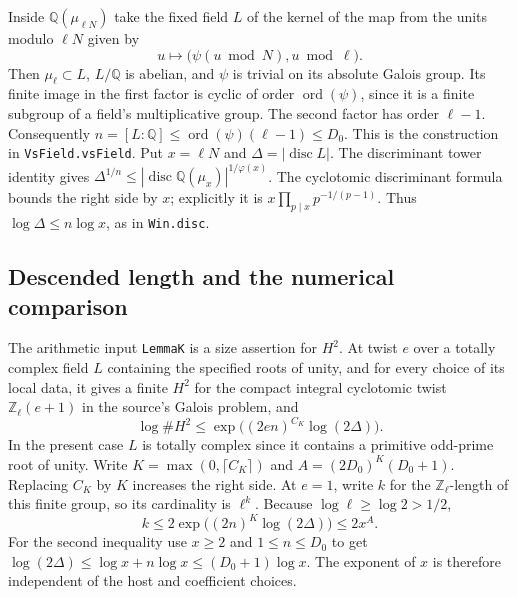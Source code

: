Inside \(\mathbb Q(\mu_{\ell N})\) take the fixed field \(L\) of
the kernel of the map from the units modulo \(\ell N\) given by
\[
            u\longmapsto \bigl(\psi(u\bmod N),u\bmod\ell\bigr).
\]
Then \(\mu_\ell\subset L\), \(L/\mathbb Q\) is abelian, and \(\psi\)
is trivial on its absolute Galois group. Its finite image in the first
factor is cyclic of order \(\operatorname{ord}(\psi)\), since it is a
finite subgroup of a field's multiplicative group. The second factor
has order \(\ell-1\). Consequently \(n=[L:\mathbb Q]\le
\operatorname{ord}(\psi)(\ell-1)\le D_0\). This is the construction in
\texttt{Vs\allowbreak{}Field.\allowbreak{}vs\allowbreak{}Field}. Put \(x=\ell N\) and
\(\Delta=|\operatorname{disc}L|\). The discriminant tower identity
gives \(\Delta^{1/n}\le
|\operatorname{disc}\mathbb Q(\mu_x)|^{1/\varphi(x)}\).
The cyclotomic discriminant formula bounds the right side by \(x\);
explicitly it is \(x\prod_{p\mid x}p^{-1/(p-1)}\).
Thus \(\log\Delta\le n\log x\), as in \texttt{Win.\allowbreak{}disc}.

\subsection{Descended length and the numerical comparison}

The arithmetic input \texttt{Lemma\allowbreak{}K} is a size assertion for \(H^2\).
At twist \(e\) over a totally complex field \(L\) containing the
specified roots of unity, and for every choice of its local data,
it gives a finite \(H^2\) for the compact integral cyclotomic twist
\(\mathbb Z_\ell(e+1)\) in the source's Galois problem, and
\[
 \log\# H^2 \le
 \exp\big((2en)^{C_K}\log(2\Delta)\big).
\]
In the present case \(L\) is totally complex since it contains a
primitive odd-prime root of unity. Write \(K=\max(0,\lceil C_K\rceil)\)
and \(A=(2D_0)^K(D_0+1)\). Replacing \(C_K\) by \(K\) increases
the right side. At \(e=1\), write \(k\) for the \(\mathbb Z_\ell\)-length
of this finite group, so its cardinality is \(\ell^k\). Because
\(\log\ell\ge\log2>1/2\),
\[
      k\le2\exp\big((2n)^K\log(2\Delta)\big)\le2x^A.
\]
For the second inequality use \(x\ge2\) and \(1\le n\le D_0\) to get
\(\log(2\Delta)\le\log x+n\log x\le(D_0+1)\log x\).
The exponent of \(x\) is therefore independent of the host and
coefficient choices.

